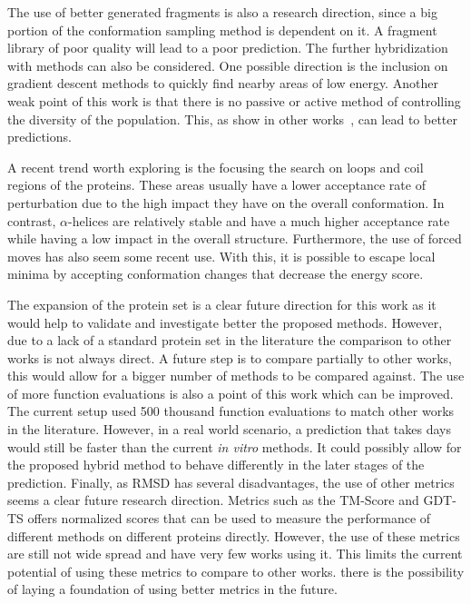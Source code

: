 The use of better generated fragments is also a research direction, since a big
portion of the conformation sampling method is dependent on it. A fragment
library of poor quality will lead to a poor prediction.
The further hybridization with methods can also be considered.  One possible
direction is the inclusion on gradient descent methods to quickly find nearby
areas of low energy.
Another weak point of this work is that there is no passive or active method of
controlling the diversity of the population. This, as show in other
works~\cite{narloch2016diversification,simoncini2017balancing}, can lead to
better predictions.

A recent trend worth exploring is the focusing the search on loops and coil
regions of the proteins. These areas usually have a lower acceptance rate of
perturbation due to the high impact they have on the overall conformation.  In
contrast, $\alpha$-helices are relatively stable and have a much higher
acceptance rate while having a low impact in the overall structure.
Furthermore, the use of forced moves has also seem some recent use. With this,
it is possible to escape local minima by accepting conformation changes that
decrease the energy score.

The expansion of the protein set is a clear future direction for this work as
it would help to validate and investigate better the proposed methods. However,
due to a lack of a standard protein set in the literature the comparison to
other works is not always direct.
A future step is to compare partially to other works, this would allow for a
bigger number of methods to be compared against.
The use of more function evaluations is also a point of this work which can be
improved. The current setup used 500 thousand function evaluations to match
other works in the literature. However, in a real world scenario, a prediction
that takes days would still be faster than the current \textit{in vitro}
methods. It could possibly allow for the proposed hybrid method to behave
differently in the later stages of the prediction.
Finally, as RMSD has several disadvantages, the use of other metrics seems a
clear future research direction. Metrics such as the TM-Score and GDT-TS offers
normalized scores that can be used to measure the performance of different
methods on different proteins directly.  However, the use of these metrics are
still not wide spread and have very few works using it. This limits the current
potential of using these metrics to compare to other works. %
there is the possibility of laying a foundation of using better metrics in the
future.

